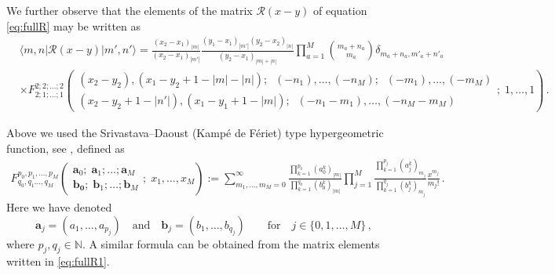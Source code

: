 \documentclass[11pt]{article}
\numberwithin{equation}{section}
\newcommand{\M}{M}
\newcommand{\eR}{\mathcal{R}}
\begin{document}
We further observe that the elements of the matrix $\eR(x-y)$ of equation \eqref{eq:fullR} may be written as
\begin{equation}
\begin{split}
   & \langle m,n|  {\eR}(x-y) |m',n'\rangle =\frac{(x_2-x_1)_{|m|} }{(x_2-x_1)_{|m'|}}\frac{(y_1-x_1)_{|m'|}(y_2-x_2)_{|n|}}{(y_2-x_1)_{|m|+|n|}} \prod_{a=1}^{\M}\binom{m_a+n_a}{m_a} \delta_{m_a+n_a,m'_a+n'_a}
    \\&\times 
    {F}_{2;1;\ldots;1}^{2;2;\ldots;2}\left(
\begin{matrix}
(x_{2}-y_{2}),(x_{1}-y_{2}+1-|m|-|n|);\;\;(-n_{1}),\ldots,(-n_{\M});\;\;(-m_{1}),\ldots,(-m_{\M})\\
(x_{2}-y_{2}+1-|n'|), (x_{1}-y_{1}+1-|m|);\;\;(-n_{1}-m_{1}),\ldots,(-n_{\M}-m_{\M})
\end{matrix};\; 1,\ldots, 1
 \right)\,.
\end{split}
\end{equation}


Above we used the Srivastava–Daoust (Kampé de Fériet) type hypergeometric function, see \cite{Srivastava1987NeumannExpansions}, defined as 
\begin{equation}\label{SD-HPGF}
\begin{split}
        F_{q_{0},q_{1}\ldots,q_{\M}}^{p_{0},p_{1},\ldots, p_{\M}}\left(\begin{matrix}
        \bm{a}_{0};\; \bm{a}_{1};\ldots; \bm{a}_{\M}\\
        \bm{b_{0}};\; \bm{b}_{1};\ldots;\bm{b}_{\M}
    \end{matrix};\; x_{1},\ldots,x_{\M}\right):= \sum_{m_{1},\ldots,m_{\M}=0}^{\infty}\frac{\prod_{k=1}^{p_{0}}(a_{0}^{k})_{|m|}}{\prod_{k=1}^{q_{0}}(b_{0}^{k})_{|m|}}\prod_{j=1}^{\M}\frac{\prod_{k=1}^{p_{j}}(a_{j}^{k})_{m_{j}}}{\prod_{k=1}^{q_{j}}(b_{j}^{k})_{m_{j}}}\frac{x^{m_{j}}}{m_{j}!}\,.
    \end{split}
\end{equation}
Here we have denoted 
\begin{equation}
    \bm{a}_{j}= (a_{1},\ldots,a_{p_{j}})\quad \text{and}\quad \bm{b}_{j}=(b_{1},\ldots,b_{q_{j}})\qquad \text{for}\quad j\in \{0,1,\ldots, \M\}\,,
\end{equation}
where $p_{j},q_{j}\in \mathbb{N}$. A similar formula can be obtained from the matrix elements written in \eqref{eq:fullR1}. 
\end{document}
